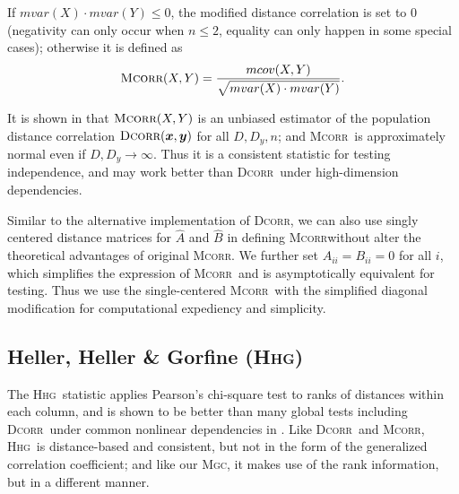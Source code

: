 \documentclass[11pt]{article}
\providecommand{\sct}[1]{{\normalfont\textsc{#1}}}
\providecommand{\mb}[1]{\boldsymbol{#1}}
\newcommand{\Mgc}{\sct{Mgc}}
\newcommand{\Hhg}{\sct{Hhg}}
\newcommand{\Dcorr}{\sct{Dcorr}}
\newcommand{\Mcorr}{\sct{Mcorr}}
\begin{document}
If $mvar(X) \cdot mvar(Y) \leq 0$, the modified distance correlation is set to $0$ (negativity can only occur when $n\leq 2$, equality can only happen in some special cases); otherwise it is defined as
\begin{equation*}
\Mcorr(X,Y)=\frac{mcov(X,Y)}{\sqrt{mvar(X) \cdot mvar(Y)}}.
\end{equation*}

It is shown in \cite{SzekelyRizzo2013a} that $\Mcorr(X,Y)$ is an unbiased estimator of the population distance correlation $\Dcorr(\mb{x},\mb{y})$ for all $D, D_y, n$; and \Mcorr~is approximately normal even if $D,D_y \rightarrow \infty$. Thus it is a consistent statistic for testing independence, and may work better than \Dcorr~under high-dimension dependencies.

Similar to the alternative implementation of \Dcorr, we can also use singly centered distance matrices for $\hat{A}$ and $\hat{B}$ in defining \Mcorr without alter the theoretical advantages of original \Mcorr. We further set $A_{ii}=B_{ii}=0$ for all $i$, which simplifies the expression of \Mcorr~and is asymptotically equivalent for testing. 
Thus we use the single-centered \Mcorr~with the simplified diagonal modification for computational expediency and simplicity.


\subsection{Heller, Heller \& Gorfine (\Hhg)}
\label{appen:hhg}

The \Hhg~statistic applies Pearson's chi-square test to ranks of distances within each column, and is shown to be better than many global tests including \Dcorr~under common nonlinear dependencies in \cite{GorfineHellerHeller2012, HellerGorfine2013}. Like \Dcorr~and \Mcorr, \Hhg~is distance-based and consistent, but not in the form of the generalized correlation coefficient; and like our \Mgc, it makes use of the rank information, but in a different manner.
\end{document}
